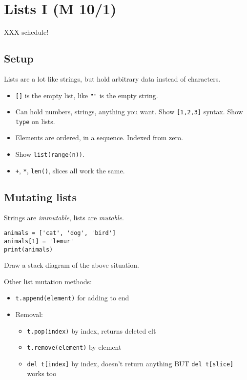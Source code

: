 \documentclass{article}
\begin{document}
\newpage
\section{Lists I (M 10/1)}

XXX schedule!

\subsection*{Setup}


Lists are a lot like strings, but hold arbitrary data instead of
characters.
\begin{itemize}
\item \verb|[]| is the empty list, like \verb|""| is the empty string.
\item Can hold numbers, strings, anything you want.  Show
  \verb|[1,2,3]| syntax.  Show \verb|type| on lists.
\item Elements are ordered, in a sequence.  Indexed from zero.
\item Show \verb|list(range(n))|.
\item \verb|+|, \verb|*|, \verb|len()|, slices all work the same.
\end{itemize}

\subsection*{Mutating lists}

Strings are \emph{immutable}, lists are \emph{mutable}.

\begin{verbatim}
animals = ['cat', 'dog', 'bird']
animals[1] = 'lemur'
print(animals)
\end{verbatim}
Draw a stack diagram of the above situation.

Other list mutation methods:
\begin{itemize}
\item \verb|t.append(element)| for adding to end
\item Removal:
  \begin{itemize}
  \item \verb|t.pop(index)| by index, returns deleted elt
  \item \verb|t.remove(element)| by element
  \item \verb|del t[index]| by index, doesn't return anything BUT
	\verb|del t[slice]| works too
  \end{itemize}
\end{itemize}
\end{document}
